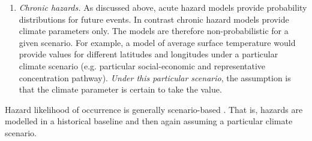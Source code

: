 \documentclass[a4paper,11pt]{extarticle} %
\theoremstyle{definition}
\begin{document}
\begin{enumerate}[label=\Alph*.]
\begin{itemize}

\item when correlation of hazards is not relevant to the calculation, for example when modelling a single asset, or for certain calculations, such as annual average ground-up loss\footnote{For calculation of certain measures only marginal probability of occurrence of a hazard at a given location is relevant. This is discussed in more detail later, but may be true for certain average measures; for measures of tail-risk, in contrast, joint probability is needed for the calculation.}, or
\item when it is satisfactory to model correlation using a heuristic approach (e.g. when obtaining a rough estimate based on 0\% ot 100\% correlation or some estimated average spatial correlation). This may be used in cases where it is desirable to separate low-risk from high risk lending portfolios for example.

\end{itemize}
\item{\emph{Chronic hazards.}}
As discussed above, acute hazard models provide probability distributions for future events. In contrast chronic hazard models provide climate parameters only. The models are therefore non-probabilistic for a given scenario. For example, a model of average surface temperature would provide values for different latitudes and longitudes under a particular climate scenario (e.g. particular social-economic and representative concentration pathway). \emph{Under this particular scenario}, the assumption is that the climate parameter is certain to take the value.

\end{enumerate}

Hazard likelihood of occurrence is generally scenario-based \cite{BertramEtAl:2020}. That is, hazards are modelled in a historical baseline and then again assuming a particular climate scenario.
\end{document}
